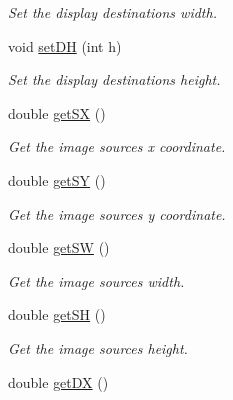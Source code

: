 \begin{DoxyCompactItemize}
\begin{DoxyCompactList}\small\item\em Set the display destinations width. \end{DoxyCompactList}\item 
void \hyperlink{classObject_a2c7a299d4311e4b2515022383f90b82a}{set\+DH} (int h)\hypertarget{classObject_a2c7a299d4311e4b2515022383f90b82a}{}\label{classObject_a2c7a299d4311e4b2515022383f90b82a}

\begin{DoxyCompactList}\small\item\em Set the display destinations height. \end{DoxyCompactList}\item 
double \hyperlink{classObject_a0f2d1703de76d3b7df5695962fe9dcc1}{get\+SX} ()\hypertarget{classObject_a0f2d1703de76d3b7df5695962fe9dcc1}{}\label{classObject_a0f2d1703de76d3b7df5695962fe9dcc1}

\begin{DoxyCompactList}\small\item\em Get the image sources x coordinate. \end{DoxyCompactList}\item 
double \hyperlink{classObject_a1ca9433993915dfb694d52c83494e73f}{get\+SY} ()\hypertarget{classObject_a1ca9433993915dfb694d52c83494e73f}{}\label{classObject_a1ca9433993915dfb694d52c83494e73f}

\begin{DoxyCompactList}\small\item\em Get the image sources y coordinate. \end{DoxyCompactList}\item 
double \hyperlink{classObject_aace84f90379d216d6f1e54b0aa4442d5}{get\+SW} ()\hypertarget{classObject_aace84f90379d216d6f1e54b0aa4442d5}{}\label{classObject_aace84f90379d216d6f1e54b0aa4442d5}

\begin{DoxyCompactList}\small\item\em Get the image sources width. \end{DoxyCompactList}\item 
double \hyperlink{classObject_a45fac8f64cae5bbc8566e69fb80037bf}{get\+SH} ()\hypertarget{classObject_a45fac8f64cae5bbc8566e69fb80037bf}{}\label{classObject_a45fac8f64cae5bbc8566e69fb80037bf}

\begin{DoxyCompactList}\small\item\em Get the image sources height. \end{DoxyCompactList}\item 
double \hyperlink{classObject_a16e291133d12358785e1bcc044615bcd}{get\+DX} ()\hypertarget{classObject_a16e291133d12358785e1bcc044615bcd}{}\label{classObject_a16e291133d12358785e1bcc044615bcd}


\end{DoxyCompactItemize}
